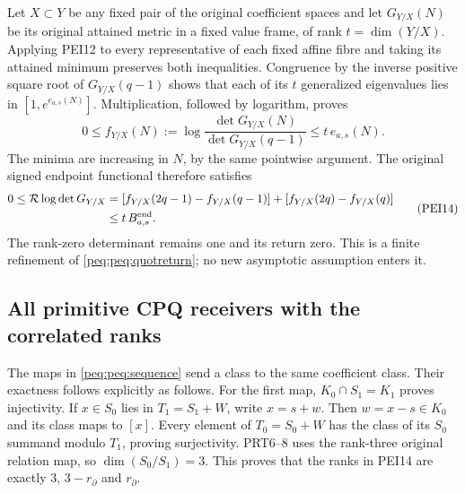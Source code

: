 Let $X\subset Y$ be any fixed pair of the original coefficient
spaces and let $G_{Y/X}(N)$ be its original attained metric in a
fixed value frame, of rank $t=\dim(Y/X)$. Applying PEI12 to every
representative of each fixed affine fibre and taking its attained
minimum preserves both inequalities. Congruence by the inverse
positive square root of $G_{Y/X}(q-1)$ shows that each of its $t$
generalized eigenvalues lies in $[1,e^{e_{a,s}(N)}]$. Multiplication,
followed by logarithm, proves
\[
 0\le f_{Y/X}(N):=
       \log\frac{\det G_{Y/X}(N)}{\det G_{Y/X}(q-1)}
       \le t\,e_{a,s}(N).
                                                               \tag{PEI13}
\]
The minima are increasing in $N$, by the same pointwise argument.
The original signed endpoint functional therefore satisfies
\[
 \begin{split}
 0\le\mathcal R\log\det G_{Y/X}
   &=[f_{Y/X}(2q-1)-f_{Y/X}(q-1)]
          +[f_{Y/X}(2q)-f_{Y/X}(q)]\\
   &\le t\,B^{\rm end}_{a,s}.
 \end{split}                                                     \tag{PEI14}
\]
The rank-zero determinant remains one and its return zero.
This is a finite refinement of \eqref{peq:peq:quotreturn}; no new
asymptotic assumption enters it.

\subsection{All primitive CPQ receivers with the correlated ranks}

The maps in \eqref{peq:peq:sequence} send a class to the same coefficient
class. Their exactness follows explicitly as follows. For the first
map, $K_0\cap S_1=K_1$ proves injectivity. If $x\in S_0$ lies in
$T_1=S_1+W$, write $x=s+w$. Then $w=x-s\in K_0$ and its class
maps to $[x]$. Every element of $T_0=S_0+W$ has the class of its
$S_0$ summand modulo $T_1$, proving surjectivity. PRT6--8 uses the
rank-three original relation map, so $\dim(S_0/S_1)=3$.
This proves that the ranks in PEI14 are exactly $3$, $3-r_\partial$
and $r_\partial$.


